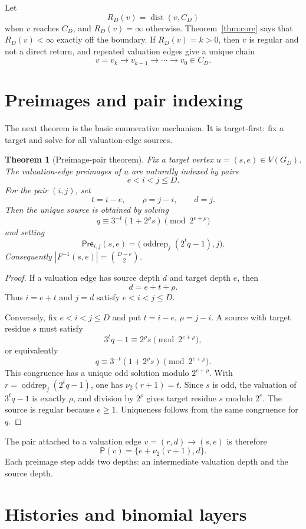 \documentclass[11pt]{article}
\newtheorem{theorem}{Theorem}[section]
\theoremstyle{definition}
\theoremstyle{remark}
\newcommand{\nuu}{\nu_2}
\newcommand{\dist}{\operatorname{dist}}
\newcommand{\oddrep}{\operatorname{oddrep}}
\newcommand{\Pre}{\mathsf{Pre}}
\newcommand{\Pair}{\mathsf P}
\begin{document}
Let
\[
R_D(v)=\dist(v,C_D)
\]
when $v$ reaches $C_D$, and $R_D(v)=\infty$ otherwise.  Theorem~\ref{thm:core} says that $R_D(v)<\infty$ exactly off the boundary.  If $R_D(v)=k>0$, then $v$ is regular and not a direct return, and repeated valuation edges give a unique chain
\[
v=v_k\to v_{k-1}\to\cdots\to v_0\in C_D.
\]

\section{Preimages and pair indexing}\label{sec:preimages}

The next theorem is the basic enumerative mechanism.  It is target-first: fix a target and solve for all valuation-edge sources.

\begin{theorem}[Preimage-pair theorem]\label{thm:preimage}
Fix a target vertex $u=(s,e)\in V(G_D)$.  The valuation-edge preimages of $u$ are naturally indexed by pairs
\[
e<i<j\le D.
\]
For the pair $(i,j)$, set
\[
t=i-e,
\qquad
\rho=j-i,
\qquad
 d=j.
\]
Then the unique source is obtained by solving
\[
q\equiv3^{-t}(1+2^\rho s)\pmod {2^{e+\rho}}
\]
and setting
\[
\Pre_{i,j}(s,e)=\bigl(\oddrep_j(2^tq-1),j\bigr).
\]
Consequently $|F^{-1}(s,e)|=\binom{D-e}{2}$.
\end{theorem}

\begin{proof}
If a valuation edge has source depth $d$ and target depth $e$, then
\[
d=e+t+\rho.
\]
Thus $i=e+t$ and $j=d$ satisfy $e<i<j\le D$.

Conversely, fix $e<i<j\le D$ and put $t=i-e$, $\rho=j-i$.  A source with target residue $s$ must satisfy
\[
3^tq-1\equiv2^\rho s\pmod {2^{e+\rho}},
\]
or equivalently
\[
q\equiv3^{-t}(1+2^\rho s)\pmod {2^{e+\rho}}.
\]
This congruence has a unique odd solution modulo $2^{e+\rho}$.  With $r=\oddrep_j(2^tq-1)$, one has $\nuu(r+1)=t$.  Since $s$ is odd, the valuation of $3^tq-1$ is exactly $\rho$, and division by $2^\rho$ gives target residue $s$ modulo $2^e$.  The source is regular because $e\ge1$.  Uniqueness follows from the same congruence for $q$.
\end{proof}

The pair attached to a valuation edge $v=(r,d)\to(s,e)$ is therefore
\[
\Pair(v)=\{e+\nuu(r+1),d\}.
\]
Each preimage step adds two depths: an intermediate valuation depth and the source depth.

\section{Histories and binomial layers}\label{sec:histories}
\end{document}
